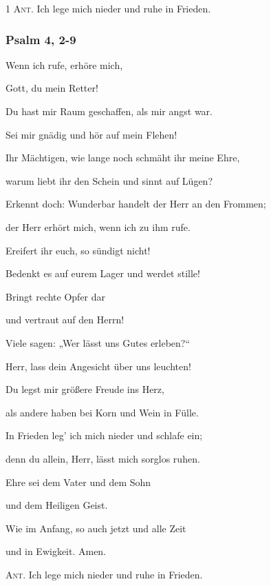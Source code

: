 \noindent \textsc{1 Ant.} Ich lege mich nieder und ruhe in Frieden.

\subsubsection{Psalm 4, 2-9}

\noindent Wenn ich rufe, erhöre mich,~\GreStar{}~\nopagebreak

Gott, du mein Retter! 

\noindent Du hast mir Raum geschaffen, als mir angst war.~\GreStar{}~\nopagebreak

Sei mir gnädig und hör auf mein Flehen!

\noindent Ihr Mächtigen, wie lange noch schmäht ihr meine Ehre,~\GreStar{}~\nopagebreak

warum liebt ihr den Schein und sinnt auf Lügen?

\noindent Erkennt doch: Wunderbar handelt der Herr an den Frommen;~\GreStar{}~\nopagebreak

der Herr erhört mich, wenn ich zu ihm rufe.

\noindent Ereifert ihr euch, so sündigt nicht!~\GreStar{}~\nopagebreak

Bedenkt es auf eurem Lager und werdet stille!

\noindent Bringt rechte Opfer dar~\GreStar{}~\nopagebreak

und vertraut auf den Herrn!

\noindent Viele sagen: „Wer lässt uns Gutes erleben?“~\GreStar{}~\nopagebreak

Herr, lass dein Angesicht über uns leuchten!

\noindent Du legst mir größere Freude ins Herz,~\GreStar{}~\nopagebreak

als andere haben bei Korn und Wein in Fülle.

\noindent In Frieden leg’ ich mich nieder und schlafe ein;~\GreStar{}~\nopagebreak

denn du allein, Herr, lässt mich sorglos ruhen.

\noindent Ehre sei dem Vater und dem Sohn~\GreStar{}~\nopagebreak

und dem Heiligen Geist.

\noindent Wie im Anfang, so auch jetzt und alle Zeit~\GreStar{}~\nopagebreak

und in Ewigkeit. Amen.

\vspace{10pt}

\noindent \textsc{Ant.} Ich lege mich nieder und ruhe in Frieden. 

